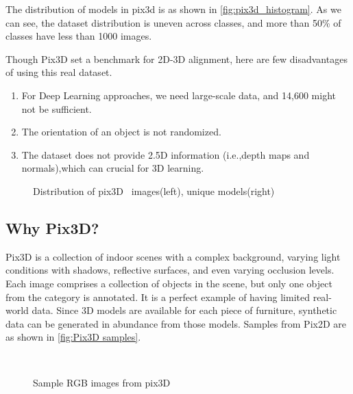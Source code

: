 The distribution of models in pix3d is as shown in \autoref{fig:pix3d_histogram}.
As we can see, the dataset distribution is uneven across classes, and more than 50\% of classes have less than 1000 images.

Though Pix3D set a benchmark for 2D-3D alignment, here are few disadvantages of using this real dataset.
\begin{enumerate}
    \item For Deep Learning approaches, we need large-scale data, and 14,600 might not be sufficient.
    \item The orientation of an object is not randomized.
    \item The dataset does not provide 2.5D information (i.e.,depth maps and normals),which can crucial for 3D learning.
\end{enumerate}

\begin{figure}[!ht]
    \resizebox{0.49\textwidth}{6cm}{}
    \resizebox{0.49\textwidth}{6cm}{}
    \caption{Distribution of pix3D~\cite{pix3d} images(left), unique models(right)}
    \label{fig:pix3d_histogram}
\end{figure}

\subsection{Why Pix3D?}\label{subsec:why-pix3d?}
Pix3D is a collection of indoor scenes with a complex background, varying light conditions with shadows, reflective surfaces, and even varying occlusion levels.
Each image comprises a collection of objects in the scene, but only one object from the category is annotated.
It is a perfect example of having limited real-world data.
Since 3D models are available for each piece of furniture, synthetic data can be generated in abundance from those models.
Samples from Pix2D are as shown in \autoref{fig:Pix3D samples}.

\begin{figure}[!ht]
    \centering
    \quad
    \\
    \quad
    \caption{Sample RGB images from pix3D}
    \label{fig:Pix3D samples}
\end{figure}

